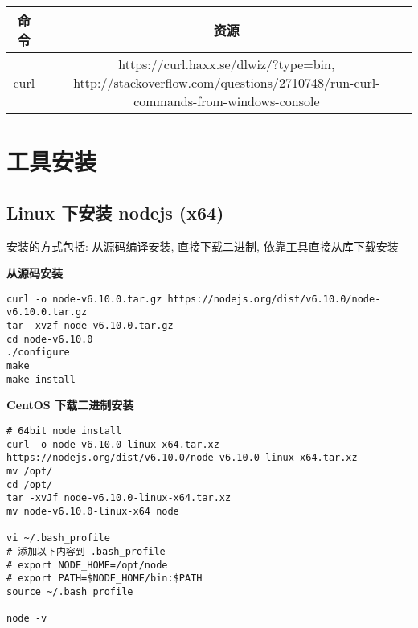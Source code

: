 \begin{longtable}[]{@{}cc@{}}
\toprule
\begin{minipage}[b]{0.09\columnwidth}\centering\strut
命令\strut
\end{minipage} & \begin{minipage}[b]{0.10\columnwidth}\centering\strut
资源\strut
\end{minipage}\tabularnewline
\midrule
\endhead
\begin{minipage}[t]{0.09\columnwidth}\centering\strut
curl\strut
\end{minipage} & \begin{minipage}[t]{0.10\columnwidth}\centering\strut
https://curl.haxx.se/dlwiz/?type=bin,
http://stackoverflow.com/questions/2710748/run-curl-commands-from-windows-console\strut
\end{minipage}\tabularnewline
\bottomrule
\end{longtable}

\section{工具安装}\label{ux5de5ux5177ux5b89ux88c5}

\subsection{Linux 下安装 nodejs
(x64)}\label{linux-ux4e0bux5b89ux88c5-nodejs-x64}

安装的方式包括: 从源码编译安装, 直接下载二进制, 依靠工具直接从库下载安装

\textbf{从源码安装}

\begin{verbatim}
curl -o node-v6.10.0.tar.gz https://nodejs.org/dist/v6.10.0/node-v6.10.0.tar.gz
tar -xvzf node-v6.10.0.tar.gz
cd node-v6.10.0
./configure
make
make install
\end{verbatim}

\textbf{CentOS 下载二进制安装}

\begin{verbatim}
# 64bit node install
curl -o node-v6.10.0-linux-x64.tar.xz https://nodejs.org/dist/v6.10.0/node-v6.10.0-linux-x64.tar.xz
mv /opt/
cd /opt/
tar -xvJf node-v6.10.0-linux-x64.tar.xz
mv node-v6.10.0-linux-x64 node

vi ~/.bash_profile
# 添加以下内容到 .bash_profile
# export NODE_HOME=/opt/node
# export PATH=$NODE_HOME/bin:$PATH
source ~/.bash_profile

node -v
\end{verbatim}

